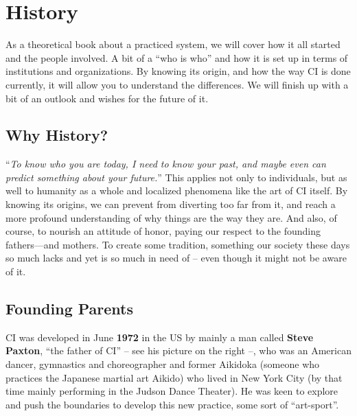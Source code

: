 \chapter{History}\label{ch:history}


As a theoretical book about a practiced system, we will cover how it all started and the people involved.
A bit of a ``who is who'' and how it is set up in terms of institutions and organizations.
By knowing its origin, and how the way CI is done currently, it will allow you to understand the differences.
We will finish up with a bit of an outlook and wishes for the future of it.


\section{Why History?}\label{sec:why-history?}

``\textit{To know who you are today, I need to know your past, and maybe even can predict something about your future.}''
This applies not only to individuals, but as well to humanity as a whole and localized phenomena like the art of CI itself.
By knowing its origins, we can prevent from diverting too far from it, and reach a more profound understanding of why things are the way they are.
And also, of course, to nourish an attitude of honor, paying our respect to the founding fathers—and mothers.
To create some tradition, something our society these days so much lacks and yet is so much in need of -- even though it might not be aware of it.

\section{Founding Parents}\label{sec:founding-parents}

CI was developed in June \textbf{1972} in the US by mainly a man called \textbf{Steve Paxton}, ``the father of CI'' -- see his picture on the right --, who was an American dancer, gymnastics and choreographer and former Aikidoka (someone who practices the Japanese martial art Aikido) who lived in New York City (by that time mainly performing in the Judson Dance Theater).
He was keen to explore and push the boundaries to develop this new practice, some sort of ``art-sport''.

